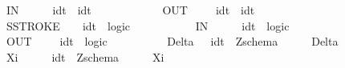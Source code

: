 \begin{isabellebody}
\ \ {\isachardoublequoteopen}{\isacharunderscore}IN{\isachardoublequoteclose}\ \ \ \ \ {\isacharcolon}{\isacharcolon}\ {\isachardoublequoteopen}idt\ {\isacharequal}{\isachargreater}\ idt{\isachardoublequoteclose}\ \ \ \ \ \ \ \ \ \ {\isacharparenleft}{\isachardoublequoteopen}{\isacharunderscore}{\isacharquery}{\isachardoublequoteclose}{\isacharparenright}\isanewline
\ \ {\isachardoublequoteopen}{\isacharunderscore}OUT{\isachardoublequoteclose}\ \ \ \ {\isacharcolon}{\isacharcolon}\ {\isachardoublequoteopen}idt\ {\isacharequal}{\isachargreater}\ idt{\isachardoublequoteclose}\ \ \ \ \ \ \ \ \ \ {\isacharparenleft}{\isachardoublequoteopen}{\isacharunderscore}{\isacharbang}{\isachardoublequoteclose}{\isacharparenright}\isanewline
\ \ SSTROKE\ \ \ {\isacharcolon}{\isacharcolon}\ {\isachardoublequoteopen}idt\ {\isacharequal}{\isachargreater}\ logic{\isachardoublequoteclose}\ \ \ \ \ \ \ \ {\isacharparenleft}{\isachardoublequoteopen}{\isacharunderscore}{\isacharprime}{\isacharbackquote}{\isachardoublequoteclose}{\isacharparenright}\ \isanewline
\ \ {\isachardoublequoteopen}{\isacharunderscore}IN{\isachardoublequoteclose}\ \ \ \ \ {\isacharcolon}{\isacharcolon}\ {\isachardoublequoteopen}idt\ {\isacharequal}{\isachargreater}\ logic{\isachardoublequoteclose}\ \ \ \ \ \ \ \ {\isacharparenleft}{\isachardoublequoteopen}{\isacharunderscore}{\isacharquery}{\isachardoublequoteclose}{\isacharparenright}\isanewline
\ \ {\isachardoublequoteopen}{\isacharunderscore}OUT{\isachardoublequoteclose}\ \ \ \ {\isacharcolon}{\isacharcolon}\ {\isachardoublequoteopen}idt\ {\isacharequal}{\isachargreater}\ logic{\isachardoublequoteclose}\ \ \ \ \ \ \ \ {\isacharparenleft}{\isachardoublequoteopen}{\isacharunderscore}{\isacharbang}{\isachardoublequoteclose}{\isacharparenright}\isanewline
\isanewline
\isanewline
\ \ {\isachardoublequoteopen}{\isacharpercent}Delta{\isachardoublequoteclose}\ \ {\isacharcolon}{\isacharcolon}\ {\isachardoublequoteopen}idt\ {\isacharequal}{\isachargreater}\ Zschema{\isachardoublequoteclose}\ \ \ \ \ \ {\isacharparenleft}{\isachardoublequoteopen}{\isacharparenleft}{\isacharpercent}Delta\ {\isacharunderscore}{\isacharparenright}{\isachardoublequoteclose}\ {\isacharbrackleft}{}{}{}{\isacharbrackright}{}{\isacharparenright}\ \isanewline
\ \ {\isachardoublequoteopen}{\isacharpercent}Xi{\isachardoublequoteclose}\ \ \ \ \ {\isacharcolon}{\isacharcolon}\ {\isachardoublequoteopen}idt\ {\isacharequal}{\isachargreater}\ Zschema{\isachardoublequoteclose}\ \ \ \ \ \ {\isacharparenleft}{\isachardoublequoteopen}{\isacharparenleft}{\isacharpercent}Xi\ {\isacharunderscore}{\isacharparenright}{\isachardoublequoteclose}\ \ \ \ {\isacharbrackleft}{}{}{}{\isacharbrackright}{}{\isacharparenright}\isanewline

\end{isabellebody}
